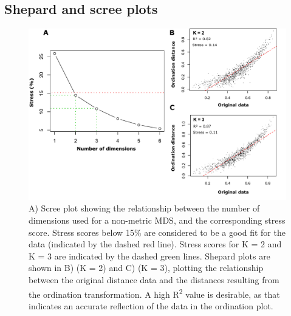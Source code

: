 \begin{landscape}
\subsection{Shepard and scree plots}
\begin{figure}[H]
	\centering
	\includegraphics[scale =0.9]{Images/scree_and_shepard_plots.pdf}
	\caption{A) Scree plot showing the relationship between the number of dimensions used for a non-metric MDS, and the corresponding stress score. Stress scores below 15\% are considered to be a good fit for the data (indicated by the dashed red line). Stress scores for K = 2 and K = 3 are indicated by the dashed green lines. Shepard plots are shown in B) (K = 2) and C) (K = 3), plotting the relationship between the original distance data and the distances resulting from the ordination transformation. A high R\textsuperscript{2} value is desirable, as that indicates an accurate reflection of the data in the ordination plot.} 
	\label{fig:shep_plots}
\end{figure}
\end{landscape}



